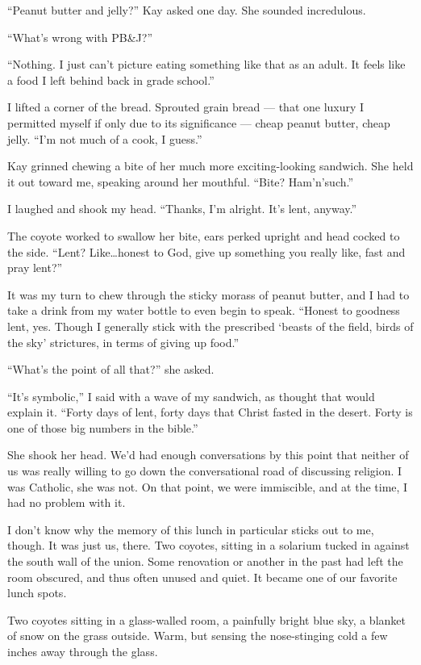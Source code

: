 ``Peanut butter and jelly?'' Kay asked one day. She sounded incredulous.

``What's wrong with PB\&J?''

``Nothing. I just can't picture eating something like that as an adult. It feels like a food I left behind back in grade school.''

I lifted a corner of the bread. Sprouted grain bread --- that one luxury I permitted myself if only due to its significance --- cheap peanut butter, cheap jelly. ``I'm not much of a cook, I guess.''

Kay grinned chewing a bite of her much more exciting-looking sandwich. She held it out toward me, speaking around her mouthful. ``Bite? Ham'n'such.''

I laughed and shook my head. ``Thanks, I'm alright. It's lent, anyway.''

The coyote worked to swallow her bite, ears perked upright and head cocked to the side. ``Lent? Like\ldots honest to God, give up something you really like, fast and pray lent?''

It was my turn to chew through the sticky morass of peanut butter, and I had to take a drink from my water bottle to even begin to speak. ``Honest to goodness lent, yes. Though I generally stick with the prescribed `beasts of the field, birds of the sky' strictures, in terms of giving up food.''

``What's the point of all that?'' she asked.

``It's symbolic,'' I said with a wave of my sandwich, as thought that would explain it. ``Forty days of lent, forty days that Christ fasted in the desert. Forty is one of those big numbers in the bible.''

She shook her head. We'd had enough conversations by this point that neither of us was really willing to go down the conversational road of discussing religion. I was Catholic, she was not. On that point, we were immiscible, and at the time, I had no problem with it.

I don't know why the memory of this lunch in particular sticks out to me, though. It was just us, there. Two coyotes, sitting in a solarium tucked in against the south wall of the union. Some renovation or another in the past had left the room obscured, and thus often unused and quiet. It became one of our favorite lunch spots.

Two coyotes sitting in a glass-walled room, a painfully bright blue sky, a blanket of snow on the grass outside. Warm, but sensing the nose-stinging cold a few inches away through the glass.

